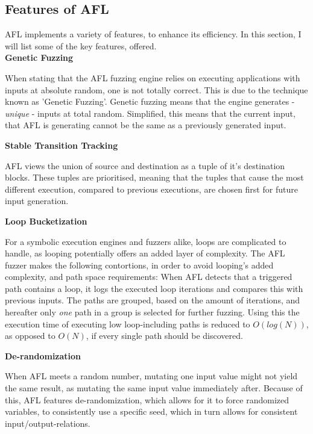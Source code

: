 \documentclass[a4paper]{article}
\newcommand{\tbf}[1]{\textbf{#1}}
\newcommand{\tit}[1]{\textit{#1}}
\newcommand{\subsubsubsection}[1]{\tbf{#1}}
\newcommand{\marginwidth}{0.5cm}
\begin{document}
\subsection{Features of AFL}
\label{sec:FeaturesAFL}
AFL implements a variety of features, to enhance its efficiency. In this section, I will list some of the key features, offered.\\
\subsubsubsection{Genetic Fuzzing}
\begin{addmargin}[\marginwidth]{0cm}
When stating that the AFL fuzzing engine relies on executing applications with inputs at absolute random, one is not totally correct. This is due to the technique known as 'Genetic Fuzzing'. Genetic fuzzing means that the engine generates - \tit{unique} - inputs at total random. Simplified, this means that the current input, that AFL is generating cannot be the same as a previously generated input.
\end{addmargin}
\subsubsubsection{Stable Transition Tracking}
\begin{addmargin}[\marginwidth]{0cm}
AFL views the union of source and destination as a tuple of it's destination blocks. These tuples are prioritised, meaning that the tuples that cause the most different execution, compared to previous executions, are chosen first for future input generation.
\end{addmargin}
\subsubsubsection{Loop Bucketization}
\begin{addmargin}[\marginwidth]{0cm}
For a symbolic execution engines and fuzzers alike, loops are complicated to handle, as looping potentially offers an added layer of complexity. The AFL fuzzer makes the following contortions, in order to avoid looping's added complexity, and path space requirements:
When AFL detects that a triggered path contains a loop, it logs the executed loop iterations and compares this with previous inputs. The paths are grouped, based on the amount of iterations, and hereafter only \tit{one} path in a group is selected for further fuzzing. Using this the execution time of executing low loop-including paths is reduced to $O(log(N))$, as opposed to $O(N)$, if every single path should be discovered.
\end{addmargin}
\subsubsubsection{De-randomization}
\begin{addmargin}[\marginwidth]{0cm}
When AFL meets a random number, mutating one input value might not yield the same result, as mutating the same input value immediately after. Because of this, AFL features de-randomization, which allows for it to force randomized variables, to consistently use a specific seed, which in turn allows for consistent input/output-relations.
\end{addmargin}
\newpage
\end{document}
